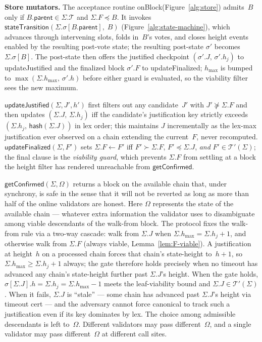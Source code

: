 \ifx\litemode\undefined\documentclass{article}\fi
\newcommand{\T}[0]{\ensuremath{\mathcal{T}}}
\newcommand{\parent}{\mathsf{parent}}
\newcommand{\hash}{\mathsf{hash}}
\newcommand{\hmax}{\ensuremath{h_{\max}}\xspace}
\newcommand{\viableTree}{\ensuremath{\mathcal{T}'}}
\newcommand{\stateTransition}{\textsf{stateTransition}\xspace}
\newcommand{\onBlock}{\textsf{onBlock}\xspace}
\newcommand{\updateJustified}{\textsf{updateJustified}\xspace}
\newcommand{\updateFinalized}{\textsf{updateFinalized}\xspace}
\newcommand{\getConfirmed}{\textsf{getConfirmed}\xspace}
\renewcommand{\paragraph}[1]{\vspace{7pt}\noindent\textbf{#1}}
\theoremstyle{plain}
\theoremstyle{definition}
\theoremstyle{remark}
\begin{document}
\paragraph{Store mutators.}
The acceptance routine \onBlock (Figure~\ref{alg:store}) admits~$B$ only if $B.\parent \in \Sigma.\T$ and $\Sigma.F \preceq B$.
It invokes $\stateTransition(\Sigma.\sigma[B.\parent],\; B)$ (Figure~\ref{alg:state-machine}), which advances through intervening slots, folds in~$B$'s votes, and closes height events enabled by the resulting post-vote state; the resulting post-state $\sigma'$ becomes $\Sigma.\sigma[B]$.
The post-state then offers the justified checkpoint $(\sigma'.J,\, \sigma'.h_j)$ to \updateJustified and the finalized block $\sigma'.F$ to \updateFinalized; $\hmax$ is bumped to $\max(\Sigma.\hmax,\, \sigma'.h)$ before either guard is evaluated, so the viability filter sees the new maximum.

$\updateJustified(\Sigma, J', h')$ first filters out any candidate~$J'$ with $J' \not\succeq \Sigma.F$ and then updates $(\Sigma.J,\, \Sigma.h_j)$ iff the candidate's justification key strictly exceeds $(\Sigma.h_j,\, \hash(\Sigma.J))$ in lex order; this maintains $J$ incrementally as the lex-max justification ever observed on a chain extending the current~$F$, never recomputed.
$\updateFinalized(\Sigma, F')$ sets $\Sigma.F \gets F'$ iff $F' \succ \Sigma.F$, $F' \preceq \Sigma.J$, \emph{and} $F' \in \viableTree(\Sigma)$; the final clause is the \emph{viability guard}, which prevents $\Sigma.F$ from settling at a block the height filter has rendered unreachable from $\getConfirmed$.

$\getConfirmed(\Sigma, \Omega)$ returns a block on the available chain that, under synchrony, is safe in the sense that it will not be reverted as long as more than half of the online validators are honest.
Here $\Omega$ represents the state of the available chain --- whatever extra information the validator uses to disambiguate among viable descendants of the walk-from block.
The protocol fixes the walk-from rule via a two-way cascade: walk from $\Sigma.J$ when $\Sigma.\hmax = \Sigma.h_j + 1$, and otherwise walk from $\Sigma.F$ (always viable, Lemma~\ref{lem:F-viable}).
A justification at height~$h$ on a processed chain forces that chain's state-height to~$h + 1$, so $\Sigma.\hmax \geq \Sigma.h_j + 1$ always; the gate therefore holds precisely when no timeout has advanced any chain's state-height further past $\Sigma.J$'s height.
When the gate holds, $\sigma[\Sigma.J].h = \Sigma.h_j = \Sigma.\hmax - 1$ meets the leaf-viability bound and $\Sigma.J \in \viableTree(\Sigma)$.
When it fails, $\Sigma.J$ is ``stale'' --- some chain has advanced past $\Sigma.J$'s height via timeout cert --- and the adversary cannot force canonical to track such a justification even if its key dominates by lex.
The choice among admissible descendants is left to~$\Omega$.
Different validators may pass different~$\Omega$, and a single validator may pass different~$\Omega$ at different call sites.
\end{document}
